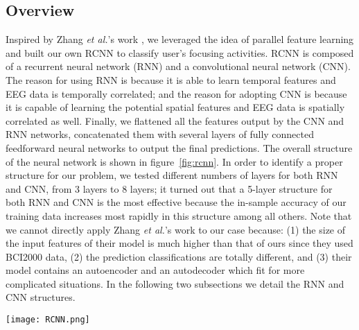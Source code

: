 \subsection{Overview}
Inspired by Zhang \emph{et al.}'s work \cite{zhang2017converting,hochreiter1997long}, we leveraged the idea of parallel feature learning and built our own RCNN to classify user's focusing activities. RCNN is composed of a recurrent neural network (RNN) and a convolutional neural network (CNN). The reason for using RNN is because it is able to learn temporal features and EEG data is temporally correlated; and the reason for adopting CNN is because it is capable of learning the potential spatial features and EEG data is spatially correlated as well. Finally, we flattened all the features output by the CNN and RNN networks, concatenated them with several layers of fully connected feedforward neural networks to output the final predictions. The overall structure of the neural network is shown in figure~\ref{fig:rcnn}. In order to identify a proper structure for our problem, we tested different numbers of layers for both RNN and CNN, from 3 layers to 8 layers; it turned out that a 5-layer structure for both RNN and CNN is the most effective because the in-sample accuracy of our training data increases most rapidly in this structure among all others. Note that we cannot directly apply Zhang \emph{et al.}'s work to our case because: (1) the size of the input features of their model is much higher than that of ours since they used BCI2000 data, (2) the prediction classifications are totally different, and (3) their model contains an autoencoder and an autodecoder which fit for more complicated situations. %
In the following two subsections we detail the RNN and CNN structures. 

\begin{figure*}[t]
        \centering
        \texttt{[image: RCNN.png]}
        \caption{The RCNN structure. There are 5 layers in the RNN model and 5 layers in the CNN model. The features output by RNN and CNN are concatenated by 3 fully connected layers for the final predictions.}
        \label{fig:rcnn}
\end{figure*}


